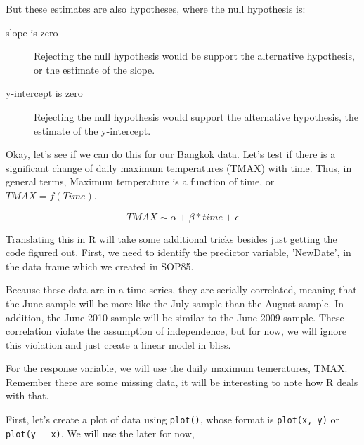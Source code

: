 \documentclass{article}\usepackage[]{graphicx}\usepackage[]{color}
\begin{document}
But these estimates are also hypotheses, where the null hypothesis is:

\begin{description}
  \item[slope is zero] Rejecting the null hypothesis would be support the alternative hypothesis, or the estimate of the slope. 
  \item[y-intercept is zero] Rejecting the null hypothesis would support the alternative hypothesis, the estimate of the y-intercept.
\end{description}

Okay, let's see if we can do this for our Bangkok data. Let's test if there is a significant change of daily maximum temperatures (TMAX) with time. Thus, in general terms, Maximum temperature is a function of time, or $TMAX = f(Time)$. 

\begin{equation}
TMAX \sim \alpha + \beta * time + \epsilon
\end{equation}

Translating this in R will take some additional tricks besides just getting the code figured out. First, we need to identify the predictor variable, 'NewDate', in the data frame which we created in SOP85. 

Because these data are in a time series, they are serially correlated, meaning that the June sample will be more like the July sample than the August sample. In addition, the June 2010 sample will be similar to the June 2009 sample. These correlation violate the assumption of independence, but for now, we will ignore this violation and just create a linear model in bliss. 

For the response variable, we will use the daily maximum temeratures, TMAX. Remember there are some missing data, it will be interesting to note how R deals with that.

First, let's create a plot of data using \texttt{plot()}, whose format is \texttt{plot(x, y)} or \texttt{plot(y ~ x)}. We will use the later for now, 
\end{document}
